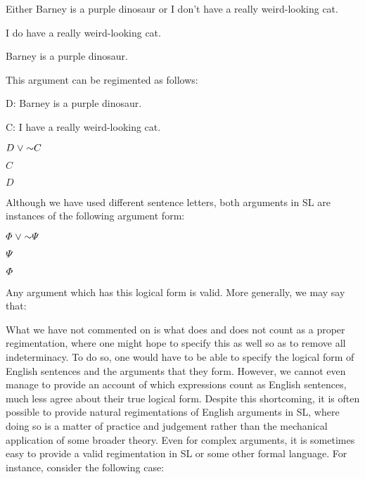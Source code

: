 \begin{earg}
  \item Either Barney is a purple dinosaur or I don't have a really weird-looking cat.
  \item I do have a really weird-looking cat.
  \item[\therefore] Barney is a purple dinosaur.
\end{earg}

This argument can be regimented as follows:

\begin{ekey}
  \item[D:] Barney is a purple dinosaur.
  \item[C:] I have a really weird-looking cat.
\end{ekey}

\begin{earg}
  \item $D\eor\enot C$
  \item $C$
  \item[\therefore] $D$
\end{earg}

Although we have used different sentence letters, both arguments in SL are instances of the following argument form:

\begin{earg}
  \item $\metaA{}\eor\enot \metaB{}$
  \item $\varPsi{}$
  \item[\therefore] $\varPhi{}$
\end{earg}

Any argument which has this logical form is valid.
More generally, we may say that:


What we have not commented on is what does and does not count as a proper regimentation, where one might hope to specify this as well so as to remove all indeterminacy.
To do so, one would have to be able to specify the logical form of English sentences and the arguments that they form.
However, we cannot even manage to provide an account of which expressions count as English sentences, much less agree about their true logical form.
Despite this shortcoming, it is often possible to provide natural regimentations of English arguments in SL, where doing so is a matter of practice and judgement rather than the mechanical application of some broader theory.
Even for complex arguments, it is sometimes easy to provide a valid regimentation in SL or some other formal language.
For instance, consider the following case:

